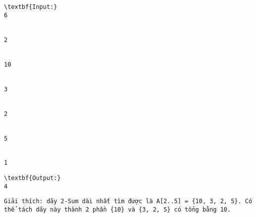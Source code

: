 \begin{verbatim}
\textbf{Input:}
6


2


10


3


2


5


1 \end{verbatim}
\begin{verbatim}
\textbf{Output:}
4\end{verbatim}
\begin{verbatim}
Giải thích: dãy 2-Sum dài nhất tìm được là A[2..5] = {10, 3, 2, 5}. Có thể tách dãy này thành 2 phần {10} và {3, 2, 5} có tổng bằng 10.\end{verbatim}